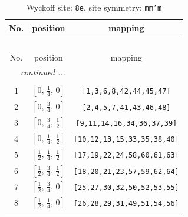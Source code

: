 \documentclass[fleqn,8pt]{jsarticle}
\begin{document}
\begin{longtable}{ccc}
\caption{Wyckoff site: {\tt 8e}, site symmetry: {\tt mm'm}}
 \\
 \hline \hline
No. & position & mapping \\ \hline \endfirsthead

\multicolumn{2}{l}{\tablename\ \thetable{}} \\
 \hline \hline
No. & position & mapping \\ \hline \endhead

 \hline \hline
\multicolumn{2}{r}{\footnotesize\it continued ...} \\ \endfoot

 \hline \hline
\multicolumn{2}{r}{} \\ \endlastfoot

1 & $\left[ 0,\, \frac{1}{4},\, 0 \right]$ & {\tt [1,3,6,8,42,44,45,47]} \\ \hline
2 & $\left[ 0,\, \frac{3}{4},\, 0 \right]$ & {\tt [2,4,5,7,41,43,46,48]} \\ \hline
3 & $\left[ 0,\, \frac{3}{4},\, \frac{1}{2} \right]$ & {\tt [9,11,14,16,34,36,37,39]} \\ \hline
4 & $\left[ 0,\, \frac{1}{4},\, \frac{1}{2} \right]$ & {\tt [10,12,13,15,33,35,38,40]} \\ \hline
5 & $\left[ \frac{1}{2},\, \frac{1}{4},\, \frac{1}{2} \right]$ & {\tt [17,19,22,24,58,60,61,63]} \\ \hline
6 & $\left[ \frac{1}{2},\, \frac{3}{4},\, \frac{1}{2} \right]$ & {\tt [18,20,21,23,57,59,62,64]} \\ \hline
7 & $\left[ \frac{1}{2},\, \frac{3}{4},\, 0 \right]$ & {\tt [25,27,30,32,50,52,53,55]} \\ \hline
8 & $\left[ \frac{1}{2},\, \frac{1}{4},\, 0 \right]$ & {\tt [26,28,29,31,49,51,54,56]} \\
\end{longtable}
\renewcommand{\arraystretch}{1.2}
\end{document}
